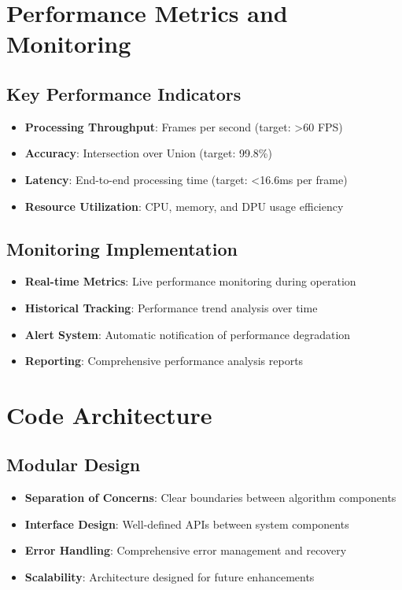 \section{Performance Metrics and Monitoring}\label{subsec:performance-monitoring}

\subsection{Key Performance Indicators}\label{subsec:kpis}

\begin{itemize}
\item \textbf{Processing Throughput}: Frames per second (target: >60 FPS)
\item \textbf{Accuracy}: Intersection over Union (target: 99.8\%)
\item \textbf{Latency}: End-to-end processing time (target: <16.6ms per frame)
\item \textbf{Resource Utilization}: CPU, memory, and DPU usage efficiency
\end{itemize}

\subsection{Monitoring Implementation}\label{subsec:monitoring-implementation}

\begin{itemize}
\item \textbf{Real-time Metrics}: Live performance monitoring during operation
\item \textbf{Historical Tracking}: Performance trend analysis over time
\item \textbf{Alert System}: Automatic notification of performance degradation
\item \textbf{Reporting}: Comprehensive performance analysis reports
\end{itemize}

\section{Code Architecture}\label{subsec:code-architecture}

\subsection{Modular Design}\label{subsec:modular-design}

\begin{itemize}
\item \textbf{Separation of Concerns}: Clear boundaries between algorithm components
\item \textbf{Interface Design}: Well-defined APIs between system components
\item \textbf{Error Handling}: Comprehensive error management and recovery
\item \textbf{Scalability}: Architecture designed for future enhancements
\end{itemize}

